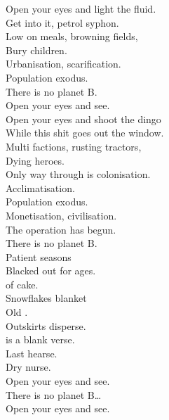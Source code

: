 
\label{album:infest-the-rats-nest}





Open your eyes and light the fluid. \\
Get into it, petrol syphon. \\
Low on meals, browning fields, \\
Bury children. \\

Urbanisation, scarification. \\
Population exodus. \\
There is no planet B. \\
Open your eyes and see. \\

Open your eyes and shoot the dingo \\
While this shit goes out the window. \\
Multi factions, rusting tractors, \\
Dying heroes. \\

Only way through is colonisation. \\
Acclimatisation. \\
Population exodus. \\
Monetisation, civilisation. \\
The operation has begun. \\
There is no planet B. \\

Patient seasons \\
Blacked out for ages. \\
 of cake. \\
Snowflakes blanket \\
Old . \\
Outskirts disperse. \\
 is a blank verse. \\
Last hearse. \\
Dry nurse. \\

Open your eyes and see. \\
There is no planet B… \\
Open your eyes and see. \\

